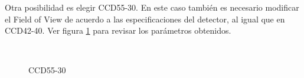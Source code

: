 \documentclass[a4paper,10pt]{article}
\begin{document}
Otra posibilidad es elegir CCD55-30. En este caso también es necesario
modificar el Field of View de acuerdo a las especificaciones del detector, al
igual que en CCD42-40.  Ver figura \ref{fig:ccd50p2} para revisar los
parámetros obtenidos.
\begin{figure}[ht!]
  \centering
  ~ 
  ~ 
  \caption{CCD55-30}
  \label{fig:ccd50p2}
\end{figure}
\end{document}
